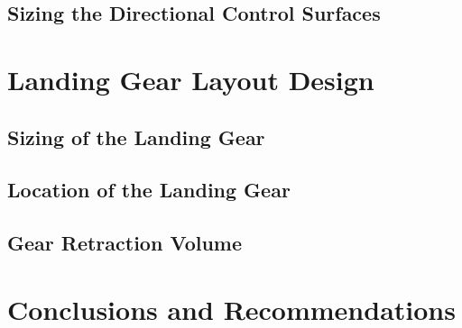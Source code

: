 \documentclass[conf]{new-aiaa}
\begin{document}
\subsection{Sizing the Directional Control Surfaces}

\section{Landing Gear Layout Design}
\subsection{Sizing of the Landing Gear}
\subsection{Location of the Landing Gear}


\subsection{Gear Retraction Volume}

\section{Conclusions and Recommendations}
\end{document}
